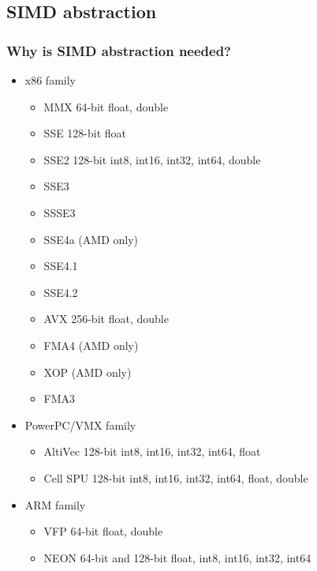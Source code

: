 \documentclass{beamer}
\begin{document}
\subsection{SIMD abstraction}
\begin{frame}
	\frametitle{Why is SIMD abstraction needed?}
	
	\begin{multicols}{2}
	\begin{itemize}
		\item x86 family
		\begin{itemize}
			\item MMX 64-bit float, double
			\item SSE 128-bit float
			\item SSE2 128-bit int8, int16, int32, int64, double
			\item SSE3
			\item SSSE3
			\item SSE4a (AMD only)
			\item SSE4.1
			\item SSE4.2
			\item AVX 256-bit float, double
			\item FMA4 (AMD only)
			\item XOP (AMD only)
			\item FMA3
		\end{itemize}
		\columnbreak
		\item PowerPC/VMX family
		\begin{itemize}
			\item AltiVec 128-bit int8, int16, int32, int64, float
			\item Cell SPU 128-bit int8, int16, int32, int64, float, double
		\end{itemize}
		\item ARM family
		\begin{itemize}
			\item VFP 64-bit float, double
			\item NEON 64-bit and 128-bit float, int8, int16, int32, int64
		\end{itemize}
		\vfill
	\end{itemize}
	\end{multicols}
		
\end{frame}
\end{document}
